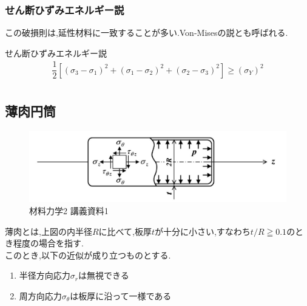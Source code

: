\documentclass[a4paper]{jsarticle}
\begin{document}
\subsubsection{せん断ひずみエネルギー説}
この破損則は,延性材料に一致することが多い.Von-Misesの説とも呼ばれる.
\begin{itembox}[l]{せん断ひずみエネルギー説}
    \begin{eqnarray*}
        \dfrac{1}{2}\left[\left(\sigma_3-\sigma_1\right)^2+\left(\sigma_1-\sigma_2\right)^2+\left(\sigma_2-\sigma_3\right)^2\right]\geq\left(\sigma_Y\right)^2\\
    \end{eqnarray*}
\end{itembox}
\subsection{薄肉円筒}
\begin{figure}[htbp]
    \begin{center}
        \includegraphics[width=150mm]{images/zairiki_image1.jpg}
        \caption{材料力学2 講義資料1}
    \end{center}
\end{figure}
薄肉とは,上図の内半径$R$に比べて,板厚$t$が十分に小さい,すなわち$t/R \geqq 0.1$のとき程度の場合を指す.\\
このとき,以下の近似が成り立つものとする.
\begin{enumerate}[(1)]
    \item 半径方向応力$\sigma_r$は無視できる
    \item 周方向応力$\sigma_\theta$は板厚に沿って一様である
\end{enumerate}
\end{document}
